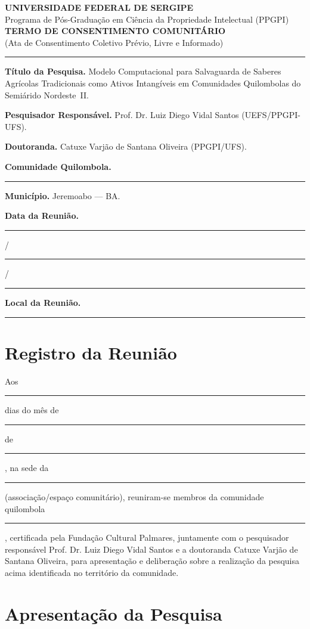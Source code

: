 \documentclass[12pt,a4paper,brazil]{article}
\begin{document}
\begin{center}
{\large\bfseries UNIVERSIDADE FEDERAL DE SERGIPE}\\[0.3cm]
{\normalsize Programa de Pós-Graduação em Ciência da Propriedade Intelectual (PPGPI)}\\[1cm]
{\Large\bfseries TERMO DE CONSENTIMENTO COMUNITÁRIO}\\[0.3cm]
{\normalsize (Ata de Consentimento Coletivo Prévio, Livre e Informado)}\\[0.5cm]
\noindent\rule{\textwidth}{0.4pt}
\end{center}

\vspace{0.5cm}

\noindent\textbf{Título da Pesquisa.} Modelo Computacional para Salvaguarda de Saberes Agrícolas Tradicionais como Ativos Intangíveis em Comunidades Quilombolas do Semiárido Nordeste~II.

\noindent\textbf{Pesquisador Responsável.} Prof. Dr. Luiz Diego Vidal Santos (UEFS/PPGPI-UFS).

\noindent\textbf{Doutoranda.} Catuxe Varjão de Santana Oliveira (PPGPI/UFS).

\noindent\textbf{Comunidade Quilombola.} \rule{8cm}{0.4pt}

\noindent\textbf{Município.} Jeremoabo --- BA.

\noindent\textbf{Data da Reunião.} \rule{2cm}{0.4pt} / \rule{2cm}{0.4pt} / \rule{3cm}{0.4pt}

\noindent\textbf{Local da Reunião.} \rule{8cm}{0.4pt}

\vspace{0.5cm}

\section*{Registro da Reunião}

Aos \rule{2cm}{0.4pt} dias do mês de \rule{3cm}{0.4pt} de \rule{3cm}{0.4pt}, na sede da \rule{6cm}{0.4pt} (associação/espaço comunitário), reuniram-se membros da comunidade quilombola \rule{6cm}{0.4pt}, certificada pela Fundação Cultural Palmares, juntamente com o pesquisador responsável Prof. Dr. Luiz Diego Vidal Santos e a doutoranda Catuxe Varjão de Santana Oliveira, para apresentação e deliberação sobre a realização da pesquisa acima identificada no território da comunidade.

\section*{Apresentação da Pesquisa}
\end{document}
